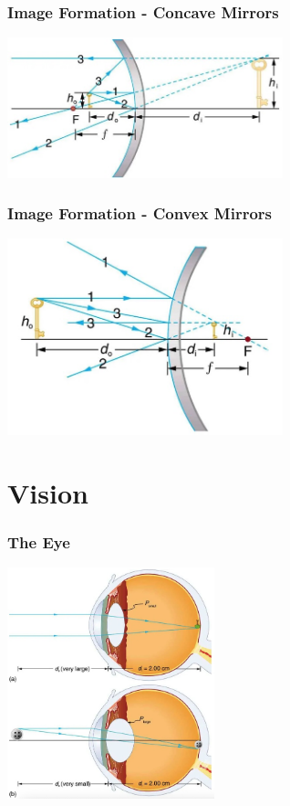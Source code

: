 \documentclass{beamer}
\begin{document}
\begin{frame}\frametitle{Image Formation - Concave Mirrors}

\begin{center}
\includegraphics[width=8cm]{fig/mirrorimage5.jpg}
\end{center}

\end{frame}

\begin{frame}\frametitle{Image Formation - Convex Mirrors}

\begin{center}
\includegraphics[width=8cm]{fig/mirrorimage6.jpg}
\end{center}

\end{frame}

\section{Vision}

\begin{frame}\frametitle{The Eye}

\begin{center}
\includegraphics[width=6cm]{fig/theI.jpg}
\end{center}

\end{frame}
\end{document}
